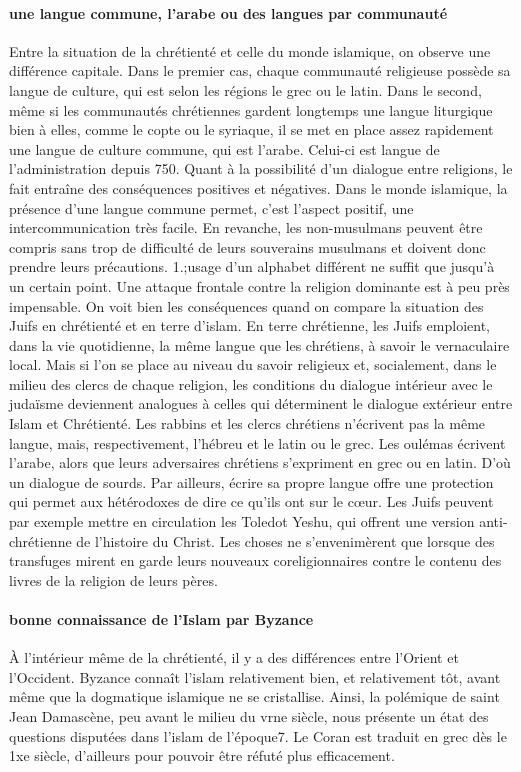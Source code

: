 \paragraph{une langue commune, l'arabe ou des langues par communauté}
Entre la situation de la chrétienté et celle du monde islamique, on observe une différence capitale. Dans le premier cas, chaque communauté religieuse possède sa langue de culture, qui est selon les régions le grec ou le latin. Dans le second, même si les communautés chrétiennes gardent longtemps une langue liturgique bien à elles, comme le copte ou le syriaque, il se met en place assez rapidement une langue de culture commune, qui est l'arabe. Celui-ci est langue de l'administration depuis 750. Quant à la possibilité d'un dialogue entre religions, le fait entraîne des conséquences positives et négatives. Dans le monde islamique, la présence d'une langue commune permet, c'est l'aspect positif, une intercommunication très facile. En revanche, les non-musulmans peuvent être compris sans trop de difficulté de leurs souverains musulmans et doivent donc prendre leurs précautions. 1.;usage d'un alphabet différent ne suffit que jusqu'à un certain point. Une attaque frontale contre la religion dominante est à peu près impensable.
On voit bien les conséquences quand on compare la situation des Juifs en chrétienté et en terre d'islam. En terre chrétienne, les Juifs emploient, dans la vie quotidienne, la même langue que les chrétiens, à savoir le vernaculaire local. Mais si l'on se place au niveau du savoir religieux et, socialement, dans le milieu des clercs de chaque religion, les conditions du dialogue intérieur avec le judaïsme deviennent analogues à celles qui déterminent le dialogue extérieur entre Islam et Chrétienté. Les rabbins et les clercs chrétiens n'écrivent pas la même langue, mais, respectivement, l'hébreu et le latin ou le grec. Les oulémas écrivent l'arabe, alors que leurs adversaires chrétiens s'expriment en grec ou en latin. D'où un dialogue de sourds. Par ailleurs, écrire sa propre langue offre une protection qui permet aux hétérodoxes de dire ce qu'ils ont sur le cœur. Les Juifs peuvent par exemple mettre en circulation les Toledot Yeshu, qui offrent une version anti-chrétienne de l'histoire du Christ. Les choses ne s'envenimèrent que lorsque des transfuges mirent en garde leurs nouveaux coreligionnaires contre le contenu des livres de la religion de leurs pères.

\paragraph{bonne connaissance de l'Islam par Byzance}
À l'intérieur même de la chrétienté, il y a des différences entre
l'Orient et l'Occident. Byzance connaît l'islam relativement bien, et relativement tôt, avant même que la dogmatique islamique ne se cristallise. Ainsi, la polémique de saint Jean Damascène, peu avant le milieu du vrne siècle, nous présente un état des questions disputées dans l'islam de l'époque7. Le Coran est traduit en grec dès le 1xe siècle, d'ailleurs pour pouvoir être réfuté plus efficacement.

